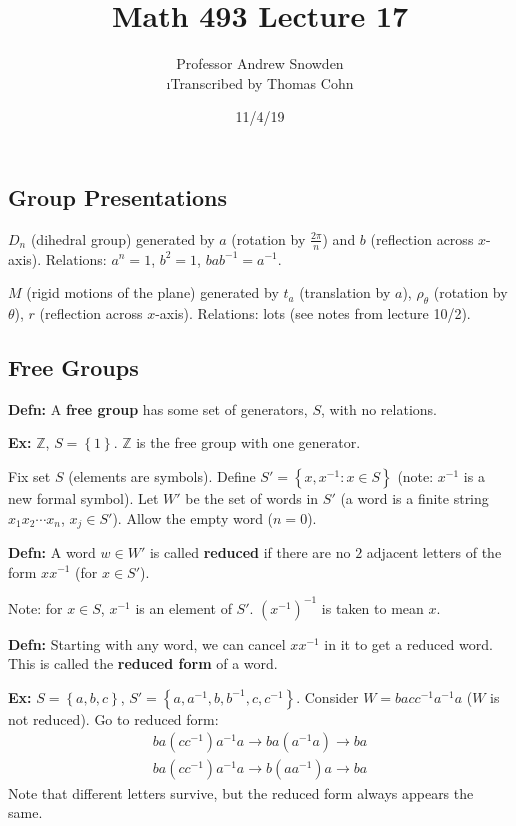 \documentclass[10pt,letterpaper]{article}
\author{Professor Andrew Snowden\\ \small\i{Transcribed by Thomas Cohn}}
\title{Math 493 Lecture 17}
\date{11/4/19} %
\newcommand{\n}{\hfill\break}
\newcommand{\hangblock}[2]{\par\noindent\settowidth{\hangindent}{\textbf{#1: }}\textbf{#1: }\!\!\!#2}
\newcommand{\defn}[1]{\hangblock{Defn}{#1}}
\newcommand{\ex}[1]{\hangblock{Ex}{#1}}
\newcommand{\set}[1]{\left\{#1\right\}}
\newcommand{\integers}{\mathbb{Z}}
\newcommand{\Z}{\integers}
\newcommand{\inv}{^{-1}}
\begin{document}
\maketitle
\setlength\RaggedRightParindent{\parindent}
\RaggedRight

\subsection*{Group Presentations}

\par\noindent
$D_{n}$ (dihedral group) generated by $a$ (rotation by $\frac{2\pi}{n}$) and $b$ (reflection across $x$-axis).\n
Relations: $a^{n}=1$, $b^{2}=1$, $bab\inv=a\inv$.\n

\par\noindent
$M$ (rigid motions of the plane) generated by $t_{a}$ (translation by $a$), $\rho_{\theta}$ (rotation by $\theta$), $r$ (reflection across $x$-axis).\n
Relations: lots (see notes from lecture 10/2).\n

\subsection*{Free Groups}

\defn{
	A \textbf{free group} has some set of generators, $S$, with no relations.\n
}

\ex{
	$\Z$, $S=\set{1}$. $\Z$ is the free group with one generator.\n
}

\par\noindent
Fix set $S$ (elements are symbols). Define $S'=\set{x,x\inv:x\in{}S}$ (note: $x\inv$ is a new formal symbol). Let $W'$ be the set of words in $S'$ (a word is a finite string $x_{1}x_{2}\cdots{}x_{n}$, $x_{j}\in{}S'$). Allow the empty word ($n=0$).\n

\defn{
	A word $w\in{}W'$ is called \textbf{reduced} if there are no $2$ adjacent letters of the form $xx\inv$ (for $x\in{}S'$).\n
}

\par\noindent
Note: for $x\in{}S$, $x\inv$ is an element of $S'$. $(x\inv)\inv$ is taken to mean $x$.\n

\defn{
	Starting with any word, we can cancel $xx\inv$ in it to get a reduced word. This is called the \textbf{reduced form} of a word.\n
}

\ex{
	$S=\set{a,b,c}$, $S'=\set{a,a\inv,b,b\inv,c,c\inv}$. Consider $W=bacc\inv{}a\inv{}a$ ($W$ is not reduced). Go to reduced form:
	\[
		\begin{array}{l}
			ba(cc\inv{})a\inv{}a\to{}ba(a\inv{}a)\to{}ba\\
			ba(cc\inv{})a\inv{}a\to{}b(aa\inv{})a\to{}ba
		\end{array}
	\]
	Note that different letters survive, but the reduced form always appears the same.\n
}
\end{document}
